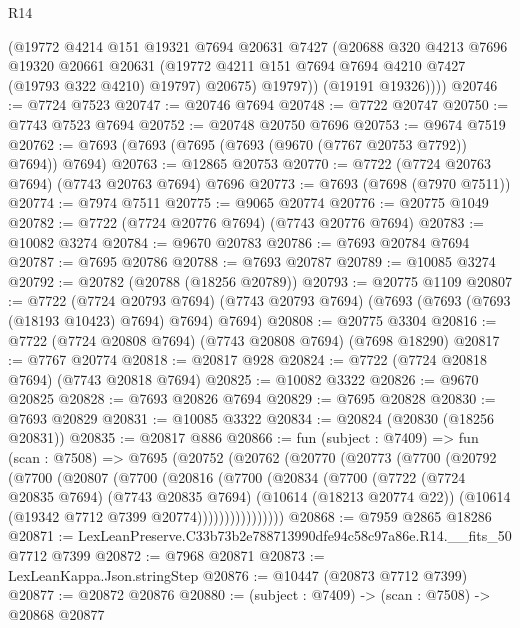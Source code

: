\begin{lexlean}{R14}
\begin{coremodule}
            (@19772
              @4214
              @151
              @19321
              @7694
              @20631
              @7427
              (@20688
                @320
                @4213
                @7696
                @19320
                @20661
                @20631
                (@19772 @4211 @151 @7694 @7694 @4210 @7427 (@19793 @322 @4210) @19797)
                @20675)
              @19797))
          (@19191 @19326))))
@20746 := @7724 @7523
@20747 := @20746 @7694
@20748 := @7722 @20747
@20750 := @7743 @7523 @7694
@20752 := @20748 @20750 @7696
@20753 := @9674 @7519
@20762 := @7693 (@7693 (@7695 (@7693 (@9670 (@7767 @20753 @7792)) @7694)) @7694)
@20763 := @12865 @20753
@20770 := @7722 (@7724 @20763 @7694) (@7743 @20763 @7694) @7696
@20773 := @7693 (@7698 (@7970 @7511))
@20774 := @7974 @7511
@20775 := @9065 @20774
@20776 := @20775 @1049
@20782 := @7722 (@7724 @20776 @7694) (@7743 @20776 @7694)
@20783 := @10082 @3274
@20784 := @9670 @20783
@20786 := @7693 @20784 @7694
@20787 := @7695 @20786
@20788 := @7693 @20787
@20789 := @10085 @3274
@20792 := @20782 (@20788 (@18256 @20789))
@20793 := @20775 @1109
@20807 := @7722
    (@7724 @20793 @7694)
    (@7743 @20793 @7694)
    (@7693 (@7693 (@7693 (@18193 @10423) @7694) @7694) @7694)
@20808 := @20775 @3304
@20816 := @7722 (@7724 @20808 @7694) (@7743 @20808 @7694) (@7698 @18290)
@20817 := @7767 @20774
@20818 := @20817 @928
@20824 := @7722 (@7724 @20818 @7694) (@7743 @20818 @7694)
@20825 := @10082 @3322
@20826 := @9670 @20825
@20828 := @7693 @20826 @7694
@20829 := @7695 @20828
@20830 := @7693 @20829
@20831 := @10085 @3322
@20834 := @20824 (@20830 (@18256 @20831))
@20835 := @20817 @886
@20866 := fun (subject : @7409) =>
  fun (scan : @7508) =>
  @7695
    (@20752
      (@20762
        (@20770
          (@20773
            (@7700
              (@20792
                (@7700
                  (@20807
                    (@7700
                      (@20816
                        (@7700
                          (@20834
                            (@7700
                              (@7722
                                (@7724 @20835 @7694)
                                (@7743 @20835 @7694)
                                (@10614 (@18213 @20774 @22))
                                (@10614 (@19342 @7712 @7399 @20774))))))))))))))))
@20868 := @7959 @2865 @18286
@20871 := LexLeanPreserve.C33b73b2e788713990dfe94c58c97a86e.R14.__fits_50 @7712 @7399
@20872 := @7968 @20871
@20873 := LexLeanKappa.Json.stringStep
@20876 := @10447 (@20873 @7712 @7399)
@20877 := @20872 @20876
@20880 := (subject : @7409) -> (scan : @7508) -> @20868 @20877

\end{coremodule}
\end{lexlean}
